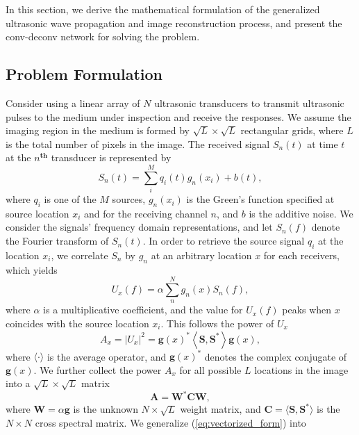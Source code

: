 \documentclass{article}
\begin{document}
In this section, we derive the mathematical formulation of the generalized ultrasonic wave propagation and image reconstruction process, and present the conv-deconv network for solving the problem.

\subsection{Problem Formulation}
\label{sub:problem_formulation}

Consider using a linear array of $N$ ultrasonic transducers to transmit ultrasonic pulses to the medium under inspection and receive the responses. We assume the imaging region in the medium is formed by $\sqrt{L} \times \sqrt{L}$ rectangular grids, where $L$ is the total number of pixels in the image. The received signal $S_n(t)$ at time $t$ at the $n^{\mathbf{th}}$ transducer is represented by
\begin{equation}
	S_n(t) = \sum_i^M q_i(t)g_n(x_i) + b(t),
	\label{eq:received_signal}
\end{equation}
where $q_i$ is one of the $M$ sources, $g_n(x_i)$ is the Green's function specified at source location $x_i$ and for the receiving channel $n$, and $b$ is the additive noise. We consider the signals' frequency domain representations, and let $S_n(f)$ denote the Fourier transform of $S_n(t)$. In order to retrieve the source signal $q_i$ at the location $x_i$, we correlate $S_n$ by $g_n$ at an arbitrary location $x$ for each receivers, which yields\cite{dougherty2008beamforming}
\begin{equation}
	U_x(f) = \alpha\sum_n^N g_n(x)S_n(f),
	\label{eq:U_f} 
\end{equation}
where $\alpha$ is a multiplicative coefficient, and the value for $U_x(f)$ peaks when $x$ coincides with the source location $x_i$. This follows the power of $U_x$
\begin{equation}
	A_x = |U_x|^2 = \mathbf{g}(x)^*\left\langle \mathbf{S},\mathbf{S}^*\right\rangle \mathbf{g}(x),
	\label{eq:power}
\end{equation}
where $\langle\cdot\rangle$ is the average operator, and $\mathbf{g}(x)^*$ denotes the complex conjugate of $\mathbf{g}(x)$. We further collect the power $A_x$ for all possible $L$ locations in the image into a $\sqrt{L} \times \sqrt{L}$ matrix
\begin{equation}
	\mathbf{A} = \mathbf{W}^*\mathbf{C}\mathbf{W},
	\label{eq:vectorized_form}
\end{equation}
where $\mathbf{W}=\alpha\mathbf{g}$ is the unknown $N \times \sqrt{L}$ weight matrix, and $\mathbf{C}=\langle \mathbf{S},\mathbf{S}^* \rangle$ is the $N \times N$ cross spectral matrix. We generalize (\ref{eq:vectorized_form}) into
\end{document}
